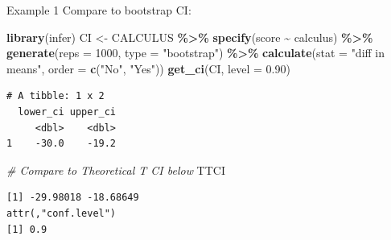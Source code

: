 \documentclass[
  ignorenonframetext,
]{beamer}
\newenvironment{Shaded}{\begin{snugshade}}{\end{snugshade}}
\newcommand{\AttributeTok}[1]{\textcolor[rgb]{0.13,0.29,0.53}{#1}}
\newcommand{\CommentTok}[1]{\textcolor[rgb]{0.56,0.35,0.01}{\textit{#1}}}
\newcommand{\DecValTok}[1]{\textcolor[rgb]{0.00,0.00,0.81}{#1}}
\newcommand{\FloatTok}[1]{\textcolor[rgb]{0.00,0.00,0.81}{#1}}
\newcommand{\FunctionTok}[1]{\textcolor[rgb]{0.13,0.29,0.53}{\textbf{#1}}}
\newcommand{\NormalTok}[1]{#1}
\newcommand{\OtherTok}[1]{\textcolor[rgb]{0.56,0.35,0.01}{#1}}
\newcommand{\SpecialCharTok}[1]{\textcolor[rgb]{0.81,0.36,0.00}{\textbf{#1}}}
\newcommand{\StringTok}[1]{\textcolor[rgb]{0.31,0.60,0.02}{#1}}
\begin{document}
\begin{frame}[fragile]{Example 1}
\protect\hypertarget{example-1-4}{}
Compare to bootstrap CI: \tiny

\begin{Shaded}
\begin{Highlighting}[]
\FunctionTok{library}\NormalTok{(infer)}
\NormalTok{CI }\OtherTok{\textless{}{-}}\NormalTok{ CALCULUS }\SpecialCharTok{\%\textgreater{}\%} 
  \FunctionTok{specify}\NormalTok{(score }\SpecialCharTok{\textasciitilde{}}\NormalTok{ calculus) }\SpecialCharTok{\%\textgreater{}\%} 
  \FunctionTok{generate}\NormalTok{(}\AttributeTok{reps =} \DecValTok{1000}\NormalTok{, }\AttributeTok{type =} \StringTok{"bootstrap"}\NormalTok{) }\SpecialCharTok{\%\textgreater{}\%} 
  \FunctionTok{calculate}\NormalTok{(}\AttributeTok{stat =} \StringTok{"diff in means"}\NormalTok{, }\AttributeTok{order =} \FunctionTok{c}\NormalTok{(}\StringTok{"No"}\NormalTok{, }\StringTok{"Yes"}\NormalTok{))}
\FunctionTok{get\_ci}\NormalTok{(CI, }\AttributeTok{level =} \FloatTok{0.90}\NormalTok{)}
\end{Highlighting}
\end{Shaded}

\begin{verbatim}
# A tibble: 1 x 2
  lower_ci upper_ci
     <dbl>    <dbl>
1    -30.0    -19.2
\end{verbatim}

\begin{Shaded}
\begin{Highlighting}[]
\CommentTok{\# Compare to Theoretical T CI below}
\NormalTok{TTCI}
\end{Highlighting}
\end{Shaded}

\begin{verbatim}
[1] -29.98018 -18.68649
attr(,"conf.level")
[1] 0.9
\end{verbatim}

\normalsize
\end{frame}
\end{document}
